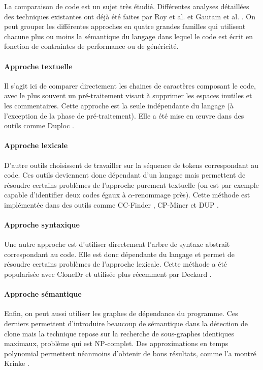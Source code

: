 La comparaison de code est un sujet très étudié.  Différentes
analyses détaillées des techniques existantes ont déjà été faites par
Roy et al. \cite{ComparisonAndEvaluation} et Gautam et
al. \cite{variousCodeClone}.  On peut grouper les différentes
approches en quatre grandes familles qui utilisent chacune plus ou
moins la sémantique du langage dans lequel le code est écrit en fonction
de contraintes de performance ou de généricité.

\paragraph{Approche textuelle}
Il s'agit ici de comparer directement les chaines de caractères
composant le code, avec le plus souvent un pré-traitement visant à
supprimer les espaces inutiles et les commentaires. Cette approche est
la seule indépendante du langage (à l'exception de la phase de
pré-traitement). Elle a été mise en œuvre dans des outils comme Duploc
\cite{ALanguageIndependent}.

\paragraph{Approche lexicale}
D'autre outils choisissent de travailler sur la séquence de tokens
correspondant au code. Ces outils deviennent donc dépendant d'un
langage mais permettent de résoudre certains problèmes de l'approche
purement textuelle (on est par exemple capable d'identifier deux codes
égaux à $\alpha$-renommage près).  Cette méthode est implémentée dans
des outils comme CC-Finder \cite{ccfinder}, CP-Miner \cite{cpminer} et
DUP \cite{dup}.

\paragraph{Approche syntaxique}
Une autre approche est d'utiliser directement l'arbre de syntaxe
abstrait correspondant au code. Elle est donc dépendante du langage et
permet de résoudre certains problèmes de l'approche lexicale. Cette
méthode a été popularisée avec CloneDr \cite{CloneDetectionUsingAST}
et utilisée plus récemment par Deckard \cite{Deckard}.

\paragraph{Approche sémantique}
Enfin, on peut aussi utiliser les graphes de dépendance
\cite{PdgOrigin} du programme. Ces derniers permettent d'introduire
beaucoup de sémantique dans la détection de clone mais la technique
repose sur la recherche de sous-graphes identiques maximaux, problème
qui est NP-complet. Des approximations en temps polynomial permettent
néanmoins d'obtenir de bons résultats, comme l'a montré Krinke
\cite{PDG}.
